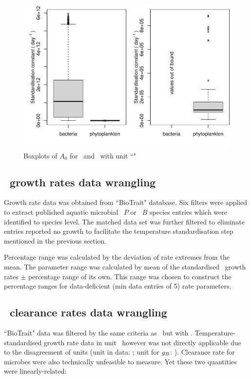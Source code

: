\documentclass[../thesis.tex]{subfiles} %
\begin{document}
\begin{figure}[H]
    \centering
    \includegraphics[width=.7\linewidth]{../result/stdCst.pdf}
    \caption[Boxplot of standardised $A_0$]{Boxplots of $A_0$ for \phy\ and \bac\ with unit ``\dayU"}
    \label{f:A0}
\end{figure}

\subsection{\Phy\ growth rates data wrangling}
Growth rate data was obtained from ``BioTrait" database\autocite{della2013thermal}.  Six filters were applied to extract published aquatic microbial \phy\ $P$ or \bac\ $B$ species entries which were identified to species level.  The matched data set was further filtered to eliminate entries reported no growth to facilitate the temperature standardisation step mentioned in the previous section.

Percentage range was calculated by the deviation of rate extremes from the mean.  The parameter range was calculated by mean of the standardised \phy\ growth rates $\pm$ percentage range of its own.  This range was chosen to construct the percentage ranges for data-deficient (min data entries of 5) rate parameters.

\subsection{\Bac\ clearance rates data wrangling}
``BioTrait" data \autocite{della2013thermal} was filtered by the same criteria as \phy\ but with \bac.  Temperature-standardised growth rate data in unit \dayU\ however was not directly applicable due to the disagreement of units (unit in data: \dayU; unit for $g_B$: \denI).  Clearance rate for microbes were also technically unfeasible to measure.  Yet these two quantities were linearly-related:
\end{document}
